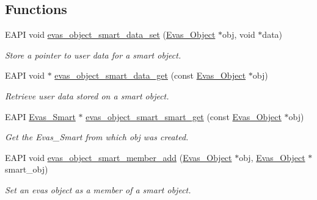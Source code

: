 \subsection*{Functions}
\begin{DoxyCompactItemize}
\item 
EAPI void \hyperlink{group__Evas__Smart__Object__Group_gae40928b2993cc169e606820ae21dbb6e}{evas\_\-object\_\-smart\_\-data\_\-set} (\hyperlink{group__Evas__Object__Group_ga9e19e6dd1f517a0ba437c0114d3e7c97}{Evas\_\-Object} $\ast$obj, void $\ast$data)
\begin{DoxyCompactList}\small\item\em Store a pointer to user data for a smart object. \item\end{DoxyCompactList}\item 
EAPI void $\ast$ \hyperlink{group__Evas__Smart__Object__Group_gad77ac4b3dcb2929ff7d02e76a26e272a}{evas\_\-object\_\-smart\_\-data\_\-get} (const \hyperlink{group__Evas__Object__Group_ga9e19e6dd1f517a0ba437c0114d3e7c97}{Evas\_\-Object} $\ast$obj)
\begin{DoxyCompactList}\small\item\em Retrieve user data stored on a smart object. \item\end{DoxyCompactList}\item 
EAPI \hyperlink{Evas_8h_a7cdfd1afece1cad64c413eb9a778ddbb}{Evas\_\-Smart} $\ast$ \hyperlink{group__Evas__Smart__Object__Group_gab1423d63011d7f3679c95ea1638fa714}{evas\_\-object\_\-smart\_\-smart\_\-get} (const \hyperlink{group__Evas__Object__Group_ga9e19e6dd1f517a0ba437c0114d3e7c97}{Evas\_\-Object} $\ast$obj)
\begin{DoxyCompactList}\small\item\em Get the Evas\_\-Smart from which {\ttfamily obj} was created. \item\end{DoxyCompactList}\item 
EAPI void \hyperlink{group__Evas__Smart__Object__Group_ga88c6f460884a87d5a2915282ab1cf06f}{evas\_\-object\_\-smart\_\-member\_\-add} (\hyperlink{group__Evas__Object__Group_ga9e19e6dd1f517a0ba437c0114d3e7c97}{Evas\_\-Object} $\ast$obj, \hyperlink{group__Evas__Object__Group_ga9e19e6dd1f517a0ba437c0114d3e7c97}{Evas\_\-Object} $\ast$smart\_\-obj)
\begin{DoxyCompactList}\small\item\em Set an evas object as a member of a smart object. \item\end{DoxyCompactList}\item 

\end{DoxyCompactItemize}
